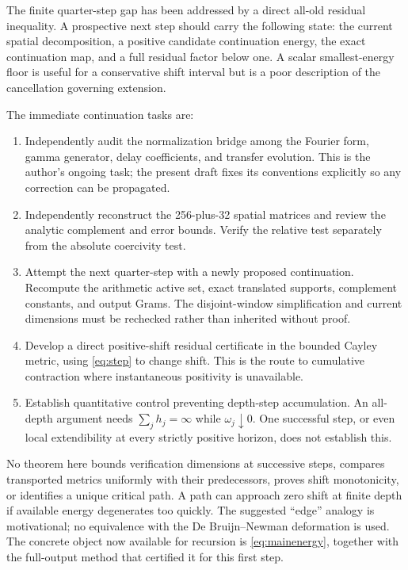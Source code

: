 \documentclass[11pt]{article}
\theoremstyle{remark}\newtheorem{remark}[theorem]{Remark}
\begin{document}
The finite quarter-step gap has been addressed by a direct all-old residual inequality. A prospective next step should carry the following state: the current spatial decomposition, a positive candidate continuation energy, the exact continuation map, and a full residual factor below one. A scalar smallest-energy floor is useful for a conservative shift interval but is a poor description of the cancellation governing extension.

The immediate continuation tasks are:
\begin{enumerate}
\item Independently audit the normalization bridge among the Fourier form, gamma generator, delay coefficients, and transfer evolution. This is the author's ongoing task; the present draft fixes its conventions explicitly so any correction can be propagated.
\item Independently reconstruct the 256-plus-32 spatial matrices and review the analytic complement and error bounds. Verify the relative test separately from the absolute coercivity test.
\item Attempt the next quarter-step with a newly proposed continuation. Recompute the arithmetic active set, exact translated supports, complement constants, and output Grams. The disjoint-window simplification and current dimensions must be rechecked rather than inherited without proof.
\item Develop a direct positive-shift residual certificate in the bounded Cayley metric, using \eqref{eq:step} to change shift. This is the route to cumulative contraction where instantaneous positivity is unavailable.
\item Establish quantitative control preventing depth-step accumulation. An all-depth argument needs $\sum_jh_j=\infty$ while $\omega_j\downarrow0$. One successful step, or even local extendibility at every strictly positive horizon, does not establish this.
\end{enumerate}
No theorem here bounds verification dimensions at successive steps, compares transported metrics uniformly with their predecessors, proves shift monotonicity, or identifies a unique critical path. A path can approach zero shift at finite depth if available energy degenerates too quickly. The suggested ``edge'' analogy is motivational; no equivalence with the De Bruijn--Newman deformation is used. The concrete object now available for recursion is \eqref{eq:mainenergy}, together with the full-output method that certified it for this first step.
\end{document}
